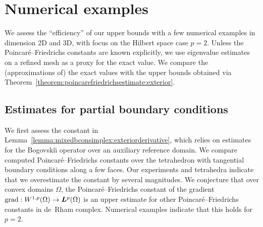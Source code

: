 \documentclass[10pt,a4paper]{article}
\begin{document}
\section{Numerical examples}\label{section:numericalexamples}

We assess the ``efficiency'' of our upper bounds with a few numerical examples in dimension 2D and 3D, with focus on the Hilbert space case $p=2$. 
Unless the Poincar\'e--Friedrichs constants are known explicitly, we use eigenvalue estimates on a refined mesh as a proxy for the exact value. We compare the (approximations of) the exact values with the upper bounds obtained via Theorem~\ref{theorem:poincarefriedrichsestimate:exterior}.

\subsection{Estimates for partial boundary conditions}

We first assess the constant in Lemma~\ref{lemma:mixedbconsimplex:exteriorderivative},
which relies on estimates for the Bogovski\u{\i} operator over an auxiliary reference domain.
We compare computed Poincar\'e--Friedrichs constants over the tetrahedron with tangential boundary conditions along a few faces. Our experiments and tetrahedra indicate that we overestimate the constant by several magnitudes.
%
We conjecture that over convex domains $\Omega$, the Poincar\'e--Friedrichs constant of the gradient $\operatorname{grad} : W^{1,p}(\Omega) \rightarrow \bm{L}^{p}(\Omega)$ is an upper estimate for other Poincar\'e--Friedrichs constants in de~Rham complex. Numerical examples indicate that this holds for $p=2$.
\end{document}

